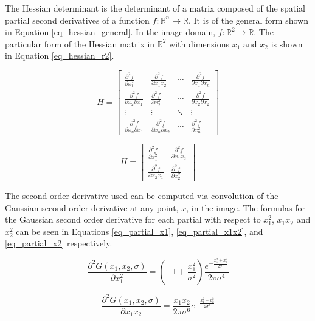 \documentclass[sigconf]{acmart}
\begin{document}
The Hessian determinant is the determinant of a matrix composed of the spatial partial second derivatives of a function $f : \mathbb{R}^n \rightarrow \mathbb{R}$. It is of the general form shown in Equation \ref{eq_hessian_general}. In the image domain, $f : \mathbb{R}^2 \rightarrow \mathbb{R}$. The particular form of the Hessian matrix in $\mathbb{R}^2$ with dimensions $x_1$ and $x_2$ is shown in Equation \ref{eq_hessian_r2}.

\begin{equation}
H = \begin{bmatrix}
\frac{\partial^2 f}{\partial x_1^2} & \frac{\partial^2 f}{\partial x_1 x_2} & \cdots & \frac{\partial^2 f}{\partial x_1 \partial x_n} \\
\frac{\partial^2 f}{\partial x_2 \partial x_1} & \frac{\partial^2 f}{\partial x_2^2} & \cdots & \frac{\partial^2 f}{\partial x_2 \partial x_2} \\
\vdots & \vdots & \ddots & \vdots \\
\frac{\partial^2 f}{\partial x_n \partial x_1} & \frac{\partial^2 f}{\partial x_n \partial x_2} & \cdots & \frac{\partial^2 f}{\partial x_n^2}
\end{bmatrix}
\label{eq_hessian_general}
\end{equation}

\begin{equation}
H = \begin{bmatrix}
\frac{\partial^2 f}{\partial x_1^2} & \frac{\partial^2 f}{\partial x_1 x_2} \\
\frac{\partial^2 f}{\partial x_2 x_1} & \frac{\partial^2 f}{\partial x_2^2}
\end{bmatrix}
\label{eq_hessian_r2}
\end{equation}

The second order derivative used can be computed via convolution of the Gaussian second order derivative at any point, $x$, in the image. The formulas for the Gaussian second order derivative for each partial with respect to $x_1^2$, $x_1 x_2$ and $x_2^2$ can be seen in Equations \ref{eq_partial_x1}, \ref{eq_partial_x1x2}, and \ref{eq_partial_x2} respectively.

\begin{equation}
\frac{\partial^2 G(x_1,x_2,\sigma)}{\partial x_1^2} = (-1 + \frac{x_1^2}{\sigma^2})\frac{e^{-\frac{x_1^2+x_2^2}{2\sigma^2}}}{2\pi \sigma^4}
\label{eq_partial_x1}
\end{equation}

\begin{equation}
\frac{\partial^2 G(x_1,x_2,\sigma)}{\partial x_1 x_2} = \frac{x_1 x_2}{2 \pi \sigma^6}e^{-\frac{x_1^2 + x_2^2}{2 \sigma^2}}
\label{eq_partial_x1x2}
\end{equation}
\end{document}
